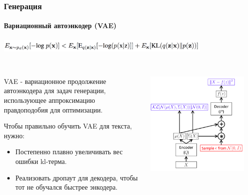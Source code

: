 \documentclass[10pt]{beamer}
\begin{document}
\begin{frame}
\frametitle{Генерация}
\framesubtitle{Вариационный автоэнкодер (VAE)}


\begin{center}
    \includegraphics[width=0.8\textwidth]{images/elbo.png} \\
    \vskip-5mm \\
    \begin{columns}
        \begin{column}{0.5\textwidth}
            VAE - вариационное продолжение автоэнкодера для задач генерации, использующее аппроксимацию правдоподобия для оптимизации.
            
            \vskip5mm
            
            \setcounter{footnote}{0}
            Чтобы правильно обучить VAE для текста\footnotemark, нужно:
            \begin{itemize}
                \item Постепенно плавно увеличивать вес ошибки kl-терма.
                \item Реализовать дропаут для декодера, чтобы тот не обучался быстрее энкодера.
            \end{itemize}
        \end{column}
        \begin{column}{0.5\textwidth}
            \begin{center}
                \includegraphics[width=0.95\textwidth]{images/vae_terms.png}
            \end{center}
        \end{column}
    \end{columns}
\end{center}


\end{frame}
\end{document}
